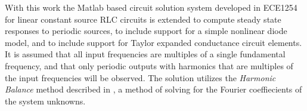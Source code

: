 %
%
With this work the Matlab based circuit solution system developed in ECE1254 for linear constant source RLC circuits is extended to compute steady state responses to periodic sources, to include support for a simple nonlinear diode model, and to include support for Taylor expanded conductance circuit elements.
It is assumed that all input frequencies are multiples of a single fundamental frequency, and that only periodic outputs with harmonics that are multiples of the input frequencies will be observed.
The solution utilizes the \emph{Harmonic Balance} method described in \citep{giannini2004NonlinearMicrowaveCircuitDesign}, a method of solving for the Fourier coeffiecients of the system unknowns.
